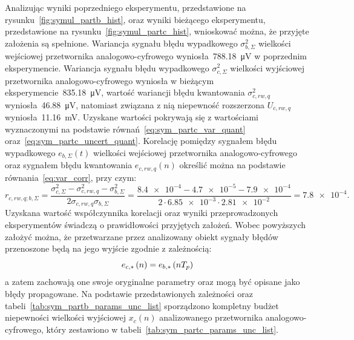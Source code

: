 Analizując wyniki poprzedniego eksperymentu, przedstawione na rysunku~\ref{fig:symul_partb_hist}, oraz wyniki bieżącego eksperymentu, przedstawione na rysunku~\ref{fig:symul_partc_hist}, wnioskować można, że przyjęte założenia są spełnione. Wariancja sygnału błędu wypadkowego $\sigma_{b,\Sigma}^{2}$ wielkości wejściowej przetwornika analogowo-cyfrowego wyniosła~\qty{788.18}{\micro V} w poprzednim eksperymencie. Wariancja sygnału błędu wypadkowego $\sigma_{c,\Sigma}^{2}$ wielkości wyjściowej przetwornika analogowo-cyfrowego wyniosła w bieżącym eksperymencie~\qty{835.18}{\micro V}, wartość wariancji błędu kwantowania $\sigma_{c,rw,q}^{2}$ wyniosła~\qty{46.88}{\micro V}, natomiast związana z nią niepewność rozszerzona $U_{c,rw,q}$ wyniosła~\qty{11.16}{mV}. Uzyskane wartości pokrywają się z wartościami wyznaczonymi na podstawie równań~\eqref{eq:sym_partc_var_quant} oraz~\eqref{eq:sym_partc_uncert_quant}. Korelację pomiędzy sygnałem błędu wypadkowego $e_{b,\Sigma}(t)$ wielkości wejściowej przetwornika analogowo-cyfrowego oraz sygnałem błędu kwantowania $e_{c,rw,q}(n)$ określić można na podstawie równania~\eqref{eq:var_corr}, przy czym:
\begin{equation}
r_{c,rw,q;b,\Sigma} = \frac{\sigma_{c,\Sigma}^{2} - \sigma_{c,rw,q}^{2} - \sigma_{b,\Sigma}^{2}}{2 \sigma_{c,rw,q} \sigma_{b,\Sigma}} = \frac{\num{8.4e-4} - \num{4.7e-5} - \num{7.9e-4}}{2 \cdot \num{6.85e-3} \cdot \num{2.81e-2}} = \num{7.8e-4} \label{eq:sym_partc_corr}.
\end{equation}
Uzyskana wartość współczynnika korelacji oraz wyniki przeprowadzonych eksperymentów świadczą o prawidłowości przyjętych założeń. Wobec powyższych założyć można, że przetwarzane przez analizowany obiekt sygnały błędów przenoszone będą na jego wyjście zgodnie z zależnością:
\begin{equation}
e_{c,*} \left(n\right) = e_{b,*} \left(nT_{p}\right) \label{eq:sym_partc_err_prop}
\end{equation}
a zatem zachowają one swoje oryginalne parametry oraz mogą być opisane jako błędy propagowane. Na podstawie przedstawionych zależności oraz tabeli~\ref{tab:sym_partb_params_unc_list} sporządzono kompletny budżet niepewności wielkości wyjściowej $x_{c}(n)$ analizowanego przetwornika analogowo-cyfrowego, który zestawiono w tabeli~\ref{tab:sym_partc_params_unc_list}.

